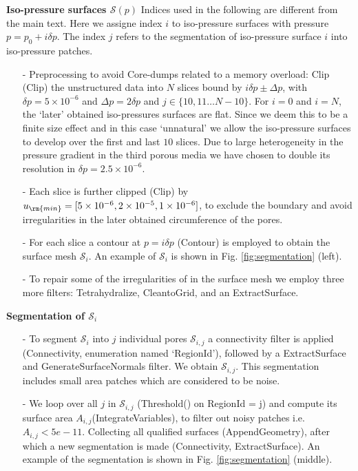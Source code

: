 \documentclass[draft,jgrga]{agutexSI2019}
\begin{document}
\begin{article}
\noindent\textbf{Iso-pressure surfaces $\mathcal{S}(p)$}
Indices used in the following are different from the main text. Here we assigne index $i$ to iso-pressure surfaces with pressure $p= p_0+ i\delta p$. The index $j$ refers to the segmentation of iso-pressure surface $i$ into iso-pressure patches. 
\begin{itemize}
	\item[-]Preprocessing to avoid Core-dumps related to a memory overload: Clip (Clip) the unstructured data into $N$ slices bound by $i\delta p\pm\Delta p$, with $\delta p = 5\times 10^{-6}$ and $\Delta p = 2\delta p$ and $j\in \{10,11\ldots N-10\}$. For $i=0$ and $i=N$, the `later' obtained iso-pressures surfaces are flat. Since we deem this to be a finite size effect and in this case `unnatural' we allow the iso-pressure surfaces to develop over the first and last $10$ slices. Due to large heterogeneity in the pressure gradient in the third porous media we have chosen to double its resolution in $\delta p = 2.5\times 10^{-6}$.
	\item[-]Each slice is further clipped (Clip) by $u_{\rm{min}} = [5\times 10^{-6},2\times 10^{-5},1\times 10^{-6}]$, to exclude the boundary and avoid irregularities in the later obtained circumference of the pores. 
	\item[-]For each slice a contour at $p =i\delta p$ (Contour) is employed to obtain the surface mesh $\mathcal{S}_i$. An example of $\mathcal{S}_i$ is shown in Fig. \ref{fig:segmentation} (left).
	\item[-]To repair some of the irregularities of in the surface mesh we employ three more filters: Tetrahydralize, CleantoGrid, and an ExtractSurface.
\end{itemize}
\noindent\textbf{Segmentation of $\mathcal{S}_i$}
\begin{itemize} 
	\item[-]To segment $\mathcal{S}_i$ into $j$ individual pores $\mathcal{S}_{i,j}$ a connectivity filter is applied (Connectivity, enumeration named `RegionId'), followed by a ExtractSurface and GenerateSurfaceNormals filter. We obtain $\mathcal{S}_{i,j}$. This segmentation includes small area patches which are considered to be noise. 
	\item[-]We loop over all $j$ in $\mathcal{S}_{i,j}$ (Threshold() on RegionId = j) and compute its surface area $A_{i,j}$(IntegrateVariables), to filter out noisy patches i.e. $A_{i,j}<5e-11$. Collecting all qualified surfaces (AppendGeometry), after which a new segmentation is made (Connectivity, ExtractSurface). An example of the segmentation is shown in Fig. \ref{fig:segmentation} (middle).

\end{itemize}
\end{article}
\end{document}
